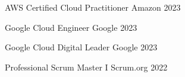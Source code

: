 

\begin{cvhonors}

  \cvhonor
    {AWS Certified Cloud Practitioner} %
    {Amazon} %
    {} %
    {2023} %
    
  \cvhonor
    {Google Cloud Engineer} %
    {Google} %
    {} %
    {2023} %
    
  \cvhonor
    {Google Cloud Digital Leader} %
    {Google} %
    {} %
    {2023} %

  \cvhonor
    {Professional Scrum Master I} %
    {Scrum.org} %
    {} %
    {2022} %


\end{cvhonors}
